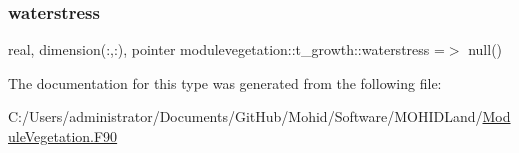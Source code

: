 \mbox{\label{structmodulevegetation_1_1t__growth_a0a9e2ceea8bf1bcc8ffa867bc108aa93}} 
\subsubsection{\texorpdfstring{waterstress}{waterstress}}
{\footnotesize\ttfamily real, dimension(\+:,\+:), pointer modulevegetation\+::t\+\_\+growth\+::waterstress =$>$ null()\hspace{0.3cm}{\ttfamily [private]}}



The documentation for this type was generated from the following file\+:\begin{DoxyCompactItemize}
\item 
C\+:/\+Users/administrator/\+Documents/\+Git\+Hub/\+Mohid/\+Software/\+M\+O\+H\+I\+D\+Land/\mbox{\hyperlink{_module_vegetation_8_f90}{Module\+Vegetation.\+F90}}\end{DoxyCompactItemize}

